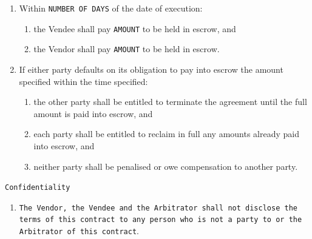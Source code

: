 \documentclass[a4paper,12pt]{article}
\begin{document}
\begin{enumerate}[resume]
	\item Within \texttt{\colorbox{branding}{NUMBER OF DAYS}} of the date of execution:
	\begin{enumerate}
		\item the Vendee shall pay \texttt{\colorbox{branding}{AMOUNT}} to be held in escrow, and
		\item the Vendor shall pay \texttt{\colorbox{branding}{AMOUNT}} to be held in escrow.
	\end{enumerate}
	\item If either party defaults on its obligation to pay into escrow the amount specified within the time specified:
	\begin{enumerate}
		\item the other party shall be entitled to terminate the agreement until the full amount is paid into escrow, and
		\item each party shall be entitled to reclaim in full any amounts already paid into escrow, and
		\item neither party shall be penalised or owe compensation to another party.
	\end{enumerate}
\end{enumerate}


\texttt{Confidentiality}

\begin{enumerate}[resume]
	\item \texttt{The Vendor, the Vendee and the Arbitrator shall not disclose the terms of this contract to any person who is not a party to or the Arbitrator of this contract}.
\end{enumerate}
\end{document}
